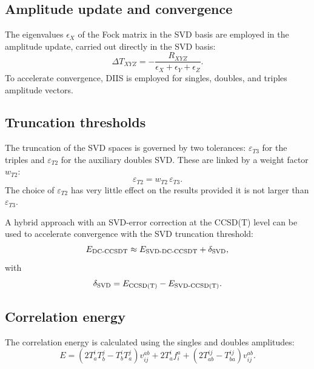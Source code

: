 \documentclass[a4paper,12pt,oneside]{book}
\begin{document}
\subsection{Amplitude update and convergence}

The eigenvalues $\epsilon_{X}$ of the Fock matrix in the SVD basis are employed 
in the amplitude update, carried out directly in the SVD basis:
\begin{equation}
\Delta T_{XYZ} = -\frac{R_{XYZ}}{\epsilon_X + \epsilon_Y + \epsilon_Z}.
\end{equation}
To accelerate convergence, DIIS is employed for singles, doubles, and triples amplitude vectors.

\subsection{Truncation thresholds}

The truncation of the SVD spaces is governed by two tolerances:
$\varepsilon_{T3}$ for the triples and $\varepsilon_{T2}$ for the auxiliary 
doubles SVD. 
These are linked by a weight factor $w_{T2}$:
\begin{equation}
\varepsilon_{T2}=w_{T2}\,\varepsilon_{T3}.
\end{equation}
The choice of $\varepsilon_{T2}$ has very little effect on the results provided 
it is not larger than $\varepsilon_{T3}$.

A hybrid approach with an SVD-error correction at the CCSD(T) level can be used 
to accelerate convergence with the SVD truncation threshold:
\begin{equation}
  E_{\textrm{DC-CCSDT}} \approx E_{\textrm{SVD-DC-CCSDT}}  + \delta_{\rm SVD},
\end{equation}
with
\begin{equation}
  \delta_{\rm SVD}=E_{\textrm{CCSD(T)}} - E_{\textrm{SVD-CCSD(T)}}.
\end{equation}


\subsection{Correlation energy}
The correlation energy is calculated using the singles and doubles amplitudes:
\begin{equation}
E= \left(2 T_a^i T_b^j - T_b^i T_a^j\right) v_{ij}^{ab} + 2 T_a^i f^a_i
+ (2T_{ab}^{ij} - T_{ba}^{ij}) v_{ij}^{ab}.
\end{equation}
\end{document}
